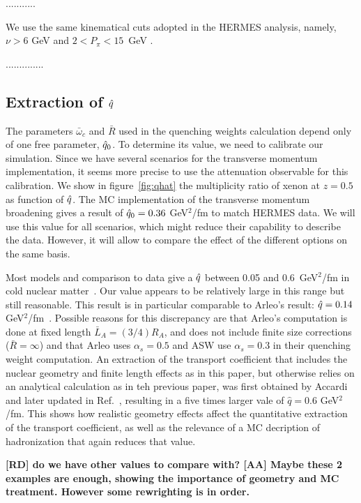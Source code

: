 ...........

We use the same kinematical cuts adopted in the HERMES analysis, namely, $\nu > 6$ GeV and $2 < P_\pi < 15$~GeV \cite{Airapetian:2007vu,Airapetian:2009jy}.

..............


\subsection{Extraction of ${\hat q}$}

The parameters $\bar\omega_c$ and $\bar R$ used in the quenching weights 
calculation depend only of one free parameter, ${\hat q}_0$. To determine its 
value, we need to calibrate our simulation. Since we have several scenarios 
for the transverse momentum implementation, it seems more precise to use the 
attenuation observable for this calibration. We show in figure~\ref{fig:qhat} 
the multiplicity ratio of xenon at $z=0.5$ as function of ${\hat q}$. The MC 
implementation of the transverse momentum broadening gives a result of ${\hat q}_0 
= 0.36$ GeV$^2$/fm to match HERMES data. We will use this value for all 
scenarios, which might reduce their capability to describe the data. However, 
it will allow to compare the effect of the different options on the same basis.

Most models and comparison to data give a ${\hat q}$ between 0.05 and 0.6~GeV$^2$/fm in cold nuclear matter~\cite{Accardi:2009qv}. Our value appears to be relatively large in this range but still reasonable. This result is in particular comparable to Arleo's 
result: ${\hat q} = 0.14$ GeV$^2$/fm~\cite{Arleo:2002ph,Arleo:2003jz}. Possible 
reasons for this discrepancy are that Arleo's computation is done at fixed 
length $\bar L_A = (3/4) R_A$, and does not include finite size corrections 
($\bar R = \infty$) and that Arleo uses $\alpha_s=0.5$ and ASW use 
$\alpha_s=0.3$ in their quenching weight computation. An extraction of the transport coefficient that includes the nuclear geometry and finite length effects as in this paper, but otherwise relies on an analytical calculation as in teh previous paper, was first obtained by Accardi \cite{Accardi:2007in} and later updated in Ref.~\cite{Accardi:2009qv}, resulting in a five times larger vale of $\hat q = 0.6$ GeV$^2$/fm. This shows how realistic geometry effects affect the quantitative extraction of the transport coefficient, as well as the relevance of a MC decription of hadronization that again reduces that value. 

{\bf [RD] do we have other values to compare with? [AA] Maybe these 2 examples are enough, showing the importance of geometry and MC treatment. However some rewrighting is in order.}


